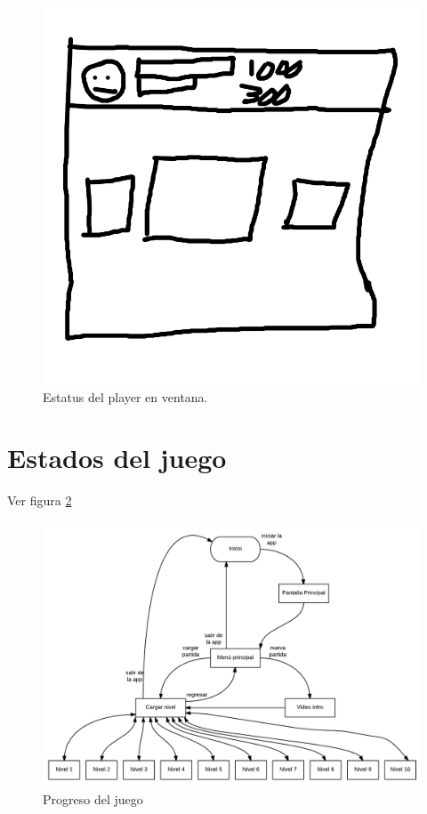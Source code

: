 \documentclass[11pt,letterpaper]{article}
\begin{document}
\begin{itemize}
\begin{figure}
				\centering
				\includegraphics[height=0.2 \textheight]{Imagenes/statusPlayer}
				\caption{Estatus del player en ventana.}
				\label{fig:statusPlayer}
			\end{figure}
\end{itemize}
	
\section{Estados del juego}
Ver figura \ref{fig:EstadosJuego}
\begin{figure}
  \centering
     \includegraphics[width=\linewidth]{Imagenes/estadosJuego}
  \caption{Progreso del juego}
  \label{fig:EstadosJuego}
\end{figure} 
\end{document}
